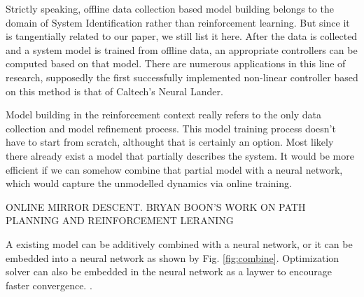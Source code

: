 \documentclass[journal]{IEEEtran}
\begin{document}
Strictly speaking, offline data collection based model building belongs to the domain of System Identification rather than reinforcement learning. But since it is tangentially related to our paper, we still list it here. After the data is collected and a system model is trained from offline data, an appropriate controllers can be computed based on that model. There are numerous applications in this line of research, supposedly the first successfully implemented non-linear controller based on this method is that of Caltech's Neural Lander. \cite{Shi2019NeuralLS}

Model building in the reinforcement context really refers to the only data collection and model refinement process. This model training process doesn't have to start from scratch, althought that is certainly an option. Most likely there already exist a model that partially describes the system. It would be more efficient if we can somehow combine that partial model with a neural network, which would capture the unmodelled dynamics via online training.

ONLINE MIRROR DESCENT. BRYAN BOON'S WORK ON PATH PLANNING AND REINFORCEMENT LERANING

A existing model can be additively combined \cite{Hewing2020LearningBasedMP} with a neural network, or it can be embedded into a neural network \cite{Mohan2020EmbeddingHP} as shown by Fig. \ref{fig:combine}. Optimization solver can also be embedded in the neural network as a laywer to encourage faster convergence. \cite{BelbutePeres2018EndtoEndDP} \cite{BelbutePeres2020CombiningDP} \cite{Agrawal2019DifferentiableCO}.
\end{document}
